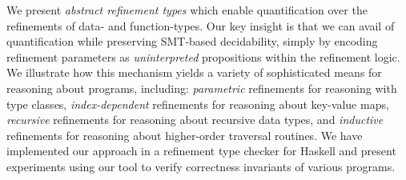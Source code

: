 We present \emph{abstract refinement types} which enable 
quantification over the refinements of data- and 
function-types. Our key insight is that we 
can avail of quantification while preserving SMT-based 
decidability, simply by encoding refinement parameters
as \emph{uninterpreted} propositions within the 
refinement logic.
%
We illustrate how this mechanism yields a variety 
of sophisticated means for reasoning about programs, including:
\emph{parametric} refinements for reasoning with 
type classes,
\emph{index-dependent} refinements for reasoning about 
key-value maps,
\emph{recursive} refinements for reasoning about 
recursive data types, and
\emph{inductive} refinements for reasoning about 
higher-order traversal routines.
%
We have implemented our approach in a refinement
type checker for Haskell and present experiments using our tool
to verify correctness invariants of various programs.
